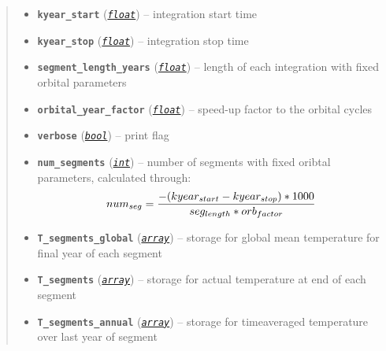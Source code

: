 \documentclass[a4paper,10pt,english]{sphinxmanual}
\begin{document}
\begin{fulllineitems}
\begin{quote}
\begin{description}
\begin{itemize}
\item {} 
\textbf{\texttt{kyear\_start}} (\href{http://docs.python.org/2.7/library/functions.html\#float}{\emph{\texttt{float}}}) -- integration start time

\item {} 
\textbf{\texttt{kyear\_stop}} (\href{http://docs.python.org/2.7/library/functions.html\#float}{\emph{\texttt{float}}}) -- integration stop time

\item {} 
\textbf{\texttt{segment\_length\_years}} (\href{http://docs.python.org/2.7/library/functions.html\#float}{\emph{\texttt{float}}}) -- length of each integration with
fixed orbital parameters

\item {} 
\textbf{\texttt{orbital\_year\_factor}} (\href{http://docs.python.org/2.7/library/functions.html\#float}{\emph{\texttt{float}}}) -- speed-up factor  to the orbital cycles

\item {} 
\textbf{\texttt{verbose}} (\href{http://docs.python.org/2.7/library/functions.html\#bool}{\emph{\texttt{bool}}}) -- print flag

\item {} 
\textbf{\texttt{num\_segments}} (\href{http://docs.python.org/2.7/library/functions.html\#int}{\emph{\texttt{int}}}) -- 
number of segments with fixed oribtal 
parameters, calculated through:
\begin{gather}
\begin{split}num_{seg} = \frac{-(kyear_{start}-kyear_{stop})*1000}{seg_{length} * orb_{factor}}\end{split}\notag
\end{gather}

\item {} 
\textbf{\texttt{T\_segments\_global}} (\href{http://docs.python.org/2.7/library/array.html\#module-array}{\emph{\texttt{array}}}) -- storage for global mean temperature
for final year of each segment

\item {} 
\textbf{\texttt{T\_segments}} (\href{http://docs.python.org/2.7/library/array.html\#module-array}{\emph{\texttt{array}}}) -- storage for actual temperature at end
of each segment

\item {} 
\textbf{\texttt{T\_segments\_annual}} (\href{http://docs.python.org/2.7/library/array.html\#module-array}{\emph{\texttt{array}}}) -- 
storage for timeaveraged temperature 
over last year of segment


\end{itemize}
\end{description}
\end{quote}
\end{fulllineitems}
\end{document}
